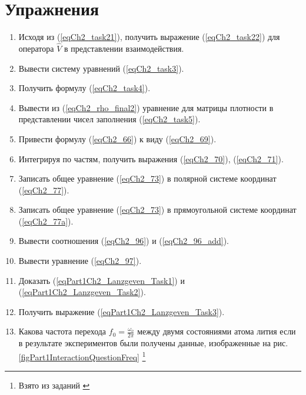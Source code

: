 \section{Упражнения}
\begin{enumerate}
\item Исходя из (\ref{eqCh2_task21}), получить выражение
  (\ref{eqCh2_task22}) для оператора $\hat{V}$ в представлении
  взаимодействия. 
\item Вывести систему уравнений (\ref{eqCh2_task3}).
\item Получить формулу (\ref{eqCh2_task4}).
\item Вывести из (\ref{eqCh2_rho_final2}) уравнение для матрицы
  плотности в представлении чисел заполнения (\ref{eqCh2_task5}). 
\item Привести формулу (\ref{eqCh2_66}) к виду (\ref{eqCh2_69}).
\item Интегрируя по частям, получить выражения (\ref{eqCh2_70}),
  (\ref{eqCh2_71}).
\item Записать общее уравнение (\ref{eqCh2_73}) в полярной системе
  координат (\ref{eqCh2_77}). 
\item Записать общее уравнение (\ref{eqCh2_73}) в прямоугольной
  системе координат (\ref{eqCh2_77a}). 
\item Вывести соотношения (\ref{eqCh2_96}) и (\ref{eqCh2_96_add}).
\item Вывести уравнение (\ref{eqCh2_97}).
\item Доказать (\ref{eqPart1Ch2_Lanzgeven_Task1}) и (\ref{eqPart1Ch2_Lanzgeven_Task2}).
\item Получить выражение (\ref{eqPart1Ch2_Lanzgeven_Task3}).
\item \label{qInteractionFreq} Какова частота перехода $f_0 = \frac{\omega_o}{2 \pi}$ между двумя
  состояниями атома лития если в результате экспериментов были
  получены данные, изображенные на
  рис. \ref{figPart1InteractionQuestionFreq} \footnote{Взято из
    заданий \cite{courseIntroQuantumOpticsCoursera}} 
\end{enumerate}

 
